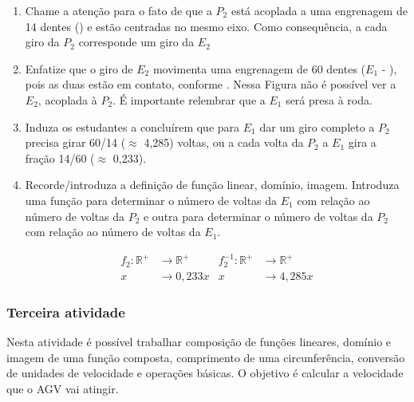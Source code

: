 \documentclass{textolivre-html}
\begin{document}
\begin{enumerate}
\item Chame a atenção para o fato de que a $P_2$ está acoplada a uma engrenagem de
14 dentes () e estão centradas no mesmo eixo. Como consequência, a
cada giro da $P_2$ corresponde um giro da $E_2$
\item Enfatize que o giro de $E_2$ movimenta uma engrenagem de 60 dentes
($E_1$ - ), pois as duas estão em contato, conforme . Nessa
Figura não é possível ver a $E_2$, acoplada à $P_2$. É importante relembrar que a $E_1$
será presa à roda.
\item Induza os estudantes a concluírem que para $E_1$ dar um giro completo a $P_2$
precisa girar 60/14 ($\approx$ 4,285) voltas, ou a cada volta da $P_2$ a $E_1$ gira a fração
14/60 ($\approx$ 0,233).
\item Recorde/introduza a definição de função linear, domínio, imagem.
Introduza uma função para determinar o número de voltas da $E_1$ com relação ao
número de voltas da $P_2$ e outra para determinar o número de voltas da $P_2$
com relação ao número de voltas da $E_1$.

    \begin{align*}
    f_2: \mathbb{R}^{+} &\rightarrow \mathbb{R}^{+} & f_{2}^{-1}: \mathbb{R}^{+} &\rightarrow \mathbb{R}^{+} \\
    x &\rightarrow 0,233x & x &\rightarrow 4,285x \nonumber
    \end{align*}

\end{enumerate}



\subsubsection{Terceira atividade}\label{sec-terceira}

Nesta atividade é possível trabalhar composição de funções lineares, domínio e
imagem de uma função composta, comprimento de uma circunferência, conversão de
unidades de velocidade e operações básicas. O objetivo é calcular a velocidade
que o AGV vai atingir.
\end{document}
